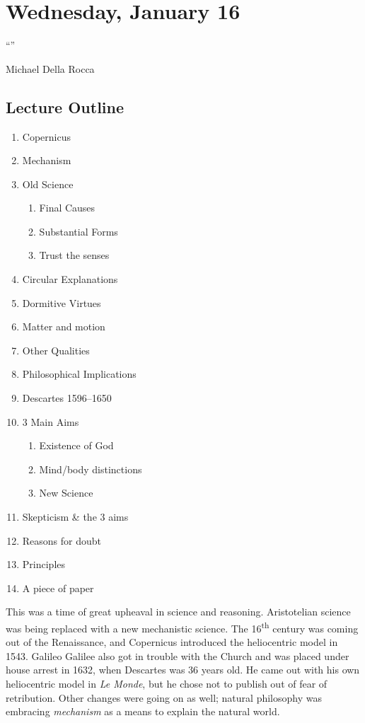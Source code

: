 
\section{Wednesday, January 16}

\epigraph{``''}{Michael Della Rocca}

\subsection{Lecture Outline}
\begin{multicols}{2}
\begin{enumerate}
\item Copernicus
\item Mechanism
\item Old Science
\begin{enumerate}
\item Final Causes
\item Substantial Forms
\item Trust the senses
\end{enumerate}
\item Circular Explanations
\item Dormitive Virtues
\item Matter and motion
\item Other Qualities
\item Philosophical Implications
\item Descartes 1596--1650
\item 3 Main Aims
\begin{enumerate}
\item Existence of God
\item Mind/body distinctions
\item New Science
\end{enumerate}
\item Skepticism \& the 3 aims
\item Reasons for doubt
\item Principles
\item A piece of paper
\end{enumerate}
\end{multicols}

This was a time of great upheaval in science and reasoning. Aristotelian science was being replaced with a new mechanistic science. The 16\textsuperscript{th} century was coming out of the Renaissance, and Copernicus introduced the heliocentric model in 1543. Galileo Galilee also got in trouble with the Church and was placed under house arrest in 1632, when Descartes was 36 years old. He came out with his own heliocentric model in \emph{Le Monde}, but he chose not to publish out of fear of retribution. Other changes were going on as well; natural philosophy was embracing \emph{mechanism} as a means to explain the natural world.

